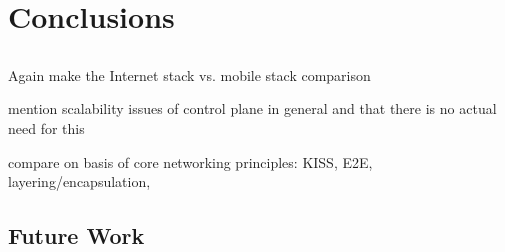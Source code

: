 \chapter{Conclusions}
\label{chap:conclusion}

\section{}

Again make the Internet stack vs. mobile stack comparison

mention scalability issues of control plane in general and that there is no actual need for this

compare on basis of core networking principles: KISS, E2E, layering/encapsulation, 


\section{Future Work}
